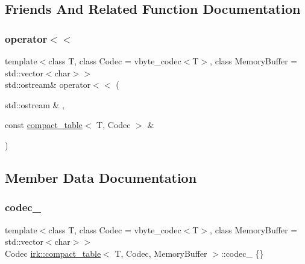 \subsection{Friends And Related Function Documentation}
\mbox{\label{classirk_1_1compact__table_aabbde77b5cb5faeef5fe72eff9624aa5}} 
\subsubsection{\texorpdfstring{operator$<$$<$}{operator<<}}
{\footnotesize\ttfamily template$<$class T, class Codec = vbyte\+\_\+codec$<$\+T$>$, class Memory\+Buffer = std\+::vector$<$char$>$$>$ \\
std\+::ostream\& operator$<$$<$ (\begin{DoxyParamCaption}\item[{std\+::ostream \&}]{,  }\item[{const \mbox{\hyperlink{classirk_1_1compact__table}{compact\+\_\+table}}$<$ T, Codec $>$ \&}]{ }\end{DoxyParamCaption})\hspace{0.3cm}{\ttfamily [friend]}}



\subsection{Member Data Documentation}
\mbox{\label{classirk_1_1compact__table_aeac5fcd509fae2f16e455fc6a37eb1d3}} 
\subsubsection{\texorpdfstring{codec\+\_\+}{codec\_}}
{\footnotesize\ttfamily template$<$class T, class Codec = vbyte\+\_\+codec$<$\+T$>$, class Memory\+Buffer = std\+::vector$<$char$>$$>$ \\
Codec \mbox{\hyperlink{classirk_1_1compact__table}{irk\+::compact\+\_\+table}}$<$ T, Codec, Memory\+Buffer $>$\+::codec\+\_\+ \{\}\hspace{0.3cm}{\ttfamily [protected]}}

